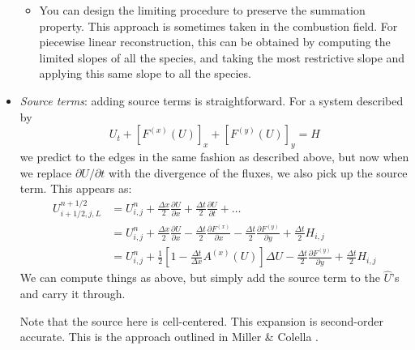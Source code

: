 \begin{itemize}
\begin{itemize}
\item You can design the limiting procedure to preserve the summation
property.  This approach is sometimes taken in the combustion field. 
For piecewise linear reconstruction, this can be obtained by computing
the limited slopes of all the species, and taking the most restrictive
slope and applying this same slope to all the species.
\end{itemize}

\item {\em Source terms}: adding source terms is straightforward.  For
a system described by
\begin{equation}
U_t + [F^{(x)}(U)]_x + [F^{(y)}(U)]_y = H
\end{equation}
we predict to the edges in the same fashion as described above, but now
when we replace $\partial U/\partial t$ with the divergence of the
fluxes, we also pick up the source term.  This appears as:
\begin{align}
U_{i+1/2,j,L}^{n+1/2} &= U_{i,j}^n 
            + \frac{\Delta x}{2} \frac{\partial U}{\partial x} 
            + \frac{\Delta t}{2} \frac{\partial U}{\partial t} + \ldots \\
&= U_{i,j}^n + \frac{\Delta x}{2} \frac{\partial U}{\partial x} 
              - \frac{\Delta t}{2} \frac{\partial F^{(x)}}{\partial x} 
              - \frac{\Delta t}{2} \frac{\partial F^{(y)}}{\partial y} 
              + \frac{\Delta t}{2} H_{i,j} \\
&= U_{i,j}^n 
 + \frac{1}{2} \left [1 -\frac{\Delta t}{\Delta x} A^{(x)}(U)\right ] \Delta U 
 - \frac{\Delta t}{2} \frac{\partial F^{(y)}}{\partial y}
 + \frac{\Delta t}{2} H_{i,j}
  \label{eq:Utaylorstatesource}
\end{align}
We can compute things as above, but simply add the source term to the
$\hat{U}$'s and carry it through.  

Note that the source here is cell-centered.  This expansion is
second-order accurate.  This is the approach outlined in Miller 
\& Colella \cite{millercolella:2002}.


\end{itemize}

